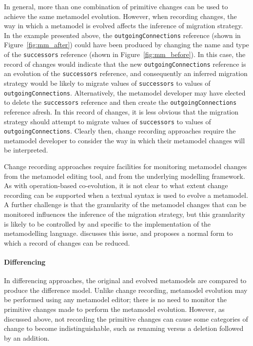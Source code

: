 In general, more than one combination of primitive changes can be used to achieve the same metamodel evolution. However, when recording changes, the way in which a metamodel is evolved affects the inference of migration strategy. In the example presented above, the \texttt{outgoingConnections} reference (shown in Figure~\ref{fig:mm_after}) could have been produced by changing the name and type of the \texttt{successors} reference (shown in Figure~\ref{fig:mm_before}). In this case, the record of changes would indicate that the new \texttt{outgoingConnections} reference is an evolution of the \texttt{successors} reference, and consequently an inferred migration strategy would be likely to migrate values of \texttt{successors} to values of \texttt{out\-go\-ingCon\-nect\-ions}. Alternatively, the metamodel developer may have elected to delete the \texttt{successors} reference and then create the \texttt{out\-go\-ingCon\-nect\-ions} reference afresh. In this record of changes, it is less obvious that the migration strategy should attempt to migrate values of \texttt{successors} to values of \texttt{out\-go\-ingCon\-nect\-ions}. Clearly then, change recording approaches require the metamodel developer to consider the way in which their metamodel changes will be interpreted.

Change recording approaches require facilities for monitoring metamodel changes from the metamodel editing tool, and from the underlying modelling framework. As with operation-based co-evolution, it is not clear to what extent change recording can be supported when a textual syntax is used to evolve a metamodel. A further challenge is that the granularity of the metamodel changes that can be monitored influences the inference of the migration strategy, but this granularity is likely to be controlled by and specific to the implementation of the metamodelling language. \cite{cicchetti08thesis} discusses this issue, and proposes a normal form to which a record of changes can be reduced.


\paragraph{Differencing}
In differencing approaches, the original and evolved metamodels are compared to produce the difference model. Unlike change recording, metamodel evolution may be performed using any metamodel editor; there is no need to monitor the primitive changes made to perform the metamodel evolution. However, as discussed above, not recording the primitive changes can cause some categories of change to become indistinguishable, such as renaming versus a deletion followed by an addition.

